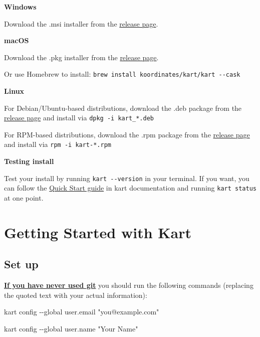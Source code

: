\documentclass[
  letterpaper,
  DIV=11,
  numbers=noendperiod]{scrartcl}
\newenvironment{Shaded}{\begin{snugshade}}{\end{snugshade}}
\newcommand{\AttributeTok}[1]{\textcolor[rgb]{1.00,0.47,0.78}{#1}}
\newcommand{\ExtensionTok}[1]{\textcolor[rgb]{0.55,0.91,0.99}{#1}}
\newcommand{\NormalTok}[1]{\textcolor[rgb]{0.97,0.97,0.95}{#1}}
\newcommand{\StringTok}[1]{\textcolor[rgb]{0.95,0.98,0.55}{#1}}
\begin{document}
\textbf{Windows}

Download the .msi installer from the
\href{https://github.com/koordinates/kart/releases}{release page}.

\textbf{macOS}

Download the .pkg installer from the
\href{https://github.com/koordinates/kart/releases}{release page}.

Or use Homebrew to install:
\texttt{brew\ install\ koordinates/kart/kart\ -\/-cask}

\textbf{Linux}

For Debian/Ubuntu-based distributions, download the .deb package from
the \href{https://github.com/koordinates/kart/releases}{release page}
and install via \texttt{dpkg\ -i\ kart\_*.deb}

For RPM-based distributions, download the .rpm package from the
\href{https://github.com/koordinates/kart/releases}{release page} and
install via \texttt{rpm\ -i\ kart-*.rpm}

\textbf{Testing install}

Test your install by running \texttt{kart\ -\/-version} in your
terminal. If you want, you can follow the
\href{https://docs.kartproject.org/en/latest/pages/quick_guide.html\#create-a-new-repository-import-dataset}{Quick
Start guide} in kart documentation and running \texttt{kart\ status} at
one point.

\section{Getting Started with Kart}\label{sec-getting-started-kart}

\subsection{Set up}\label{sec-setup}

\ul{\textbf{If you have never used git}} you should run the following
commands (replacing the quoted text with your actual information):

\begin{Shaded}
\begin{Highlighting}[]
\ExtensionTok{kart}\NormalTok{ config }\AttributeTok{{-}{-}global}\NormalTok{ user.email }\StringTok{"you@example.com"}
\end{Highlighting}
\end{Shaded}

\begin{Shaded}
\begin{Highlighting}[]
\ExtensionTok{kart}\NormalTok{ config }\AttributeTok{{-}{-}global}\NormalTok{ user.name }\StringTok{"Your Name"}
\end{Highlighting}
\end{Shaded}
\end{document}
